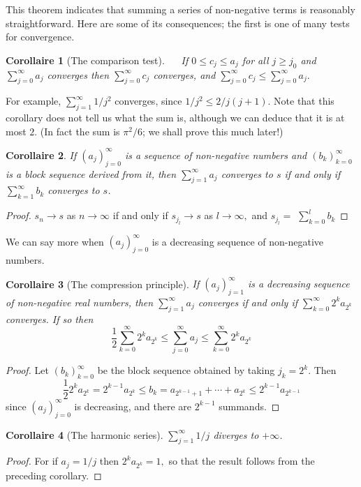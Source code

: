\documentclass[12pt]{book}
\theoremstyle{definition}\newtheorem{dfn}{Définition}[chapter]
\theoremstyle{plain}\newtheorem{thm}{Théorème}[chapter]
\theoremstyle{plain}\newtheorem{prp}{Proposition}[chapter]
\theoremstyle{plain}\newtheorem{lem}{\bf Lemme}[chapter]
\theoremstyle{plain}\newtheorem{axm}{\bf Axiome}[chapter]
\theoremstyle{plain}\newtheorem{lmm}{\bf Lemme}[chapter]
\theoremstyle{plain}\newtheorem{exm}{\bf Example}[chapter]
\theoremstyle{plain}\newtheorem{cor}{\bf Corollaire}[chapter]
\theoremstyle{remark}\newtheorem{rem}{Remarque}[chapter]
\begin{document}
This theorem indicates that summing a series of non-negative terms is reasonably straightforward. Here are some of its consequences; the first is one of many tests for convergence.

\begin{cor}[The comparison test]
$\quad$ If $0 \leq c_{j} \leq a_{j}$ for all $j \geq j_{0}$ and $\sum_{j=0}^{\infty} a_{j}$ converges then $\sum_{j=0}^{\infty} c_{j}$ converges, and $\sum_{j=0}^{\infty} c_{j} \leq \sum_{j=0}^{\infty} a_{j}.$
\end{cor} 
For example, $\sum_{j=1}^{\infty} 1 / j^{2}$ converges, since $1 / j^{2} \leq 2 / j(j+1)$. Note that this corollary does not tell us what the sum is, although we can deduce that it is at most $2 .$ (In fact the sum is $\pi^{2} / 6$; we shall prove this much later!)
\begin{cor}
If $\left(a_{j}\right)_{j=0}^{\infty}$ is a sequence of non-negative numbers and $\left(b_{k}\right)_{k=0}^{\infty}$ is a block sequence derived from it, then $\sum_{j=1}^{\infty} a_{j}$ converges to $s$ if and only if $\sum_{k=1}^{\infty} b_{k}$ converges to $s$.
\end{cor}
\begin{proof}
$s_{n} \rightarrow s$ as $n \rightarrow \infty$ if and only if $s_{j_{l}} \rightarrow s$ as $l \rightarrow \infty,$ and $s_{j_{l}}=$ $\sum_{k=0}^{l} b_{k}$
\end{proof}
We can say more when $\left(a_{j}\right)_{j=0}^{\infty}$ is a decreasing sequence of non-negative numbers.
\begin{cor}[The compression principle]
If $\left(a_{j}\right)_{j=1}^{\infty}$ is a decreasing sequence of non-negative real numbers, then $\sum_{j=1}^{\infty} a_{j}$ converges if and only if $\sum_{k=0}^{\infty} 2^{k} a_{2^{k}}$ converges. If so then
$$
\frac{1}{2} \sum_{k=0}^{\infty} 2^{k} a_{2^{k}} \leq \sum_{j=0}^{\infty} a_{j} \leq \sum_{k=0}^{\infty} 2^{k} a_{2^{k}}
$$
\end{cor}
\begin{proof}
Let $\left(b_{k}\right)_{k=0}^{\infty}$ be the block sequence obtained by taking $j_{k}=2^{k} .$ Then
$$
\frac{1}{2} 2^{k} a_{2^{k}}=2^{k-1} a_{2^{k}} \leq b_{k}=a_{2^{k-1}+1}+\cdots+a_{2^{k}} \leq 2^{k-1} a_{2^{k-1}}
$$
since $\left(a_{j}\right)_{j=0}^{\infty}$ is decreasing, and there are $2^{k-1}$ summands.
\end{proof}
\begin{cor}[The harmonic series]
$\sum_{j=1}^{\infty} 1 / j$ diverges to $+\infty$.
\end{cor}  
\begin{proof}
For if $a_{j}=1 / j$ then $2^{k} a_{2^{k}}=1,$ so that the result follows from the preceding corollary.
\end{proof}
\end{document}
